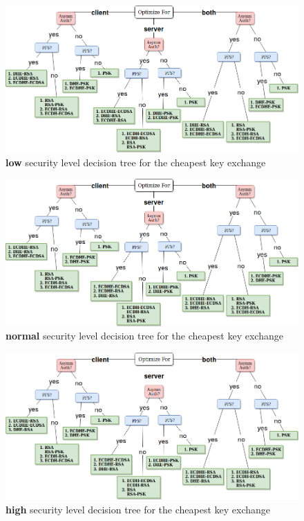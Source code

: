 \documentclass{llncs}
\begin{document}
\begin{figure}
  \centering
  \includegraphics[width=1.0\textwidth]{img/dt_low_sl.png}
  \centering \caption{\label{fig:dt-low-sl} \textbf{low} security level decision tree for the cheapest key exchange}
\end{figure}

\begin{figure}
  \centering
  \includegraphics[width=1.0\textwidth]{img/dt_normal_sl.png}
  \centering \caption{\label{fig:dt-normal-sl} \textbf{normal} security level decision tree for the cheapest key exchange}
\end{figure}

\begin{figure}
  \centering
  \includegraphics[width=1.0\textwidth]{img/dt_high_sl.png}
  \centering \caption{\label{fig:dt-high-sl} \textbf{high} security level decision tree for the cheapest key exchange}
\end{figure}
\end{document}
